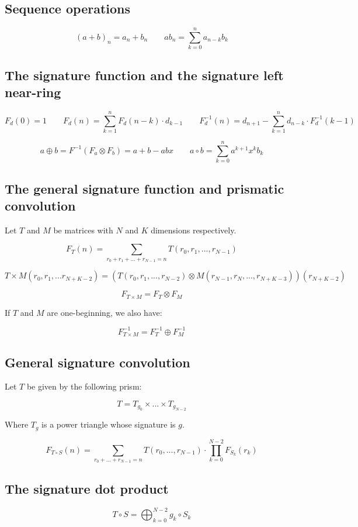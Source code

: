 \documentclass{article}
\begin{document}
\subsection{Sequence operations}

$$ (a+b)_n = a_n + b_n \qquad ab_n = \sum_{k=0}^{n} a_{n-k} b_k $$

\subsection{The signature function and the signature left near-ring}

$$F_{d}(0) = 1 \qquad  F_{d}(n) = \sum_{k=1}^{n} F_{d}(n-k) \cdot d_{k-1} \qquad F_{d}^{-1}(n) = d_{n+1} - \sum_{k=1}^{n} d_{n-k} \cdot F_{d}^{-1}(k-1)$$

$$a \oplus b = F^{-1} (F_a \otimes F_b) = a + b - abx \qquad a \circ b = \sum_{k=0}^{n} a^{k+1} x^k b_k$$

\subsection{The general signature function and prismatic convolution}

\noindent Let $T$ and $M$ be matrices with $N$ and $K$ dimensions respectively.

$$F_{T} (n) = \sum_{r_0 + r_1 + ... + r_{N-1} = n} T(r_0, r_1, ..., r_{N-1})$$

$$T \times M (r_0, r_1, ... r_{N + K - 2}) = \left( T(r_0, r_1, ..., r_{N - 2}) \otimes M (r_{N-1}, r_N, ..., r_{N + K - 3}) \right) (r_{N + K - 2})$$

$$F_{T \times M} = F_T \otimes F_M$$

\noindent If $T$ and $M$ are one-beginning, we also have:

$$F_{T \times M}^{-1} = F_T^{-1} \oplus F_M^{-1}$$

\subsection{General signature convolution}

\noindent Let $T$ be given by the following prism:

$$T =  T_{g_0} \times ... \times T_{g_{N-2}}$$

\noindent Where $T_g$ is a power triangle whose signature is $g$.

$$F_{T \circ S}(n) = \sum_{r_0 + ... + r_{N-1} = n} T(r_0, ... , r_{N-1}) \cdot \prod_{k=0}^{N-2} F_{S_k} (r_k) $$

\subsection{The signature dot product}

$$T \circ S = \bigoplus_{k=0}^{N-2} g_k \circ S_k$$
\end{document}
